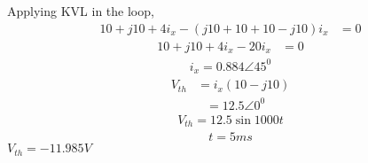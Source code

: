 \documentclass[journal,12pt,twocolumn]{IEEEtran}
\theoremstyle{remark}
\begin{document}
Applying KVL in the loop, \\[2pt]
\begin{align}
    10+j10+4i_x-(j10+10+10-j10)i_x&=0\end{align}
    \begin{align}
    10+j10+4i_x-20i_x&=0
\end{align}
\begin{align}
    i_x=0.884\angle 45^{0}
\end{align}
\begin{align}
    V_{th}&=i_x(10-j10)\end{align}
    \begin{align}&=12.5\angle0^{0}
\end{align}
\begin{align}
    V_{th}=12.5\sin1000t
\end{align}
\begin{align}
    t=5ms
\end{align}
\therefore $V_{th}=-11.985V$
\end{document}
